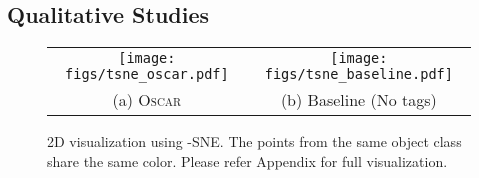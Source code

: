\documentclass[runningheads]{llncs}
\newcommand{\short}{\textsc{Oscar}}
\begin{document}
\begin{comment}
\midrule
\multicolumn{8}{c}{5K Test Set} \\ \hline
VSE++~\cite{faghri2017vse++} & - &  & - &  &  & - &  \\
DPC~\cite{zheng2017dual} & - &  &  &  &  &  &  \\
CAMP~\cite{wang2019camp} & - &  &  &   &  &   &  \\
SCAN~\cite{lee2018stacked} & - &  &  &  &  &  &  \\
SCG~\cite{shi2019knowledge} & - &  &  &  &  &  &  \\
Unicoder-VL~\cite{li2019unicoder} & \texttt{B} &  &  &  &  &  &  \\
\textsc{UNITER}~\cite{chen2019uniter} & \texttt{B} &  &  &  &  &  &  \\
\textsc{UNITER}~\cite{chen2019uniter} & \texttt{L} &  &  &  &  &  &  \\
\hline
\rowcolor{Gray} 
\multirow{2}{*}{\short{}} & \texttt{B} &  &  &  &  &  &  \\ \rowcolor{Gray} 
 & \texttt{L} & \textcolor{blue}{} & \textcolor{blue}{} & \textcolor{blue}{} & \textcolor{blue}{} & \textcolor{blue}{} & \textcolor{blue}{} \\ 
\bottomrule
\end{tabular}
\end{center}
\end{table*}
\end{comment}





 
\subsection{Qualitative Studies}

\begin{figure*}[t!]
\centering
\begin{tabular}{c c}
	\hspace{-2mm}
	\texttt{[image: figs/tsne\_oscar.pdf]} & 
	 \hspace{-0mm}
	\texttt{[image: figs/tsne\_baseline.pdf]}
	\\
	(a) \short{} \vspace{2mm} & 
	\hspace{2mm}  
	(b) Baseline (No tags) \hspace{-0mm}
\end{tabular}
\vspace{-2mm}
\caption{2D visualization using -SNE. The points from the same object class share the same color. Please refer Appendix for full visualization.}
\label{fig:tnse}
\end{figure*}
\end{document}
